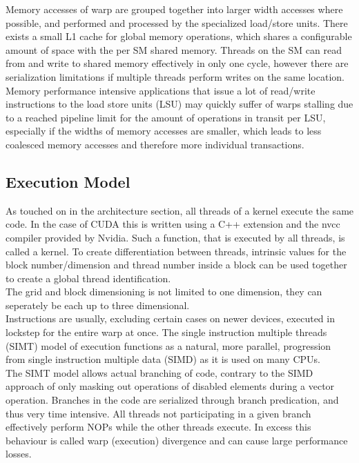 \documentclass{tudscrreprt}
\begin{document}
				Memory accesses of warp are grouped together into larger width accesses where possible, and performed and processed by the specialized load/store units. There exists a small L1 cache for global memory operations, which shares a configurable amount of space with the per SM shared memory. Threads on the SM can read from and write to shared memory effectively in only one cycle, however there are serialization limitations if multiple threads perform writes on the same location. \\
				Memory performance intensive applications that issue a lot of read/write instructions to the load store units (LSU) may quickly suffer of warps stalling due to a reached pipeline limit for the amount of operations in transit per LSU, especially if the widths of memory accesses are smaller, which leads to less coalesced memory accesses and therefore more individual transactions. \\
			
			\subsection{Execution Model}
				\label{sec:gpu_execution_model}
				As touched on in the architecture section, all threads of a kernel execute the same code. In the case of CUDA this is written using a C++ extension and the nvcc compiler provided by Nvidia. Such a function, that is executed by all threads, is called a kernel. To create differentiation between threads, intrinsic values for the block number/dimension and thread number inside a block can be used together to create a global thread identification. \\
				The grid and block dimensioning is not limited to one dimension, they can seperately be each up to three dimensional. \\
				
				Instructions are usually, excluding certain cases on newer devices, executed in lockstep for the entire warp at once. The single instruction multiple threads (SIMT) model of execution functions as a natural, more parallel, progression from single instruction multiple data (SIMD) as it is used on many CPUs. \\
				The SIMT model allows actual branching of code, contrary to the SIMD approach of only masking out operations of disabled elements during a vector operation. Branches in the code are serialized through branch predication, and thus very time intensive. All threads not participating in a given branch effectively perform NOPs while the other threads execute. In excess this behaviour is called warp (execution) divergence and can cause large performance losses. \\
				
\end{document}
